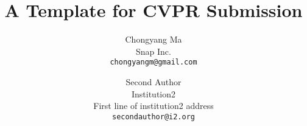 \documentclass[10pt,twocolumn,letterpaper]{article}
\begin{document}
\title{A Template for CVPR Submission}

\author{Chongyang Ma\\
Snap Inc.\\
{\tt\small chongyangm@gmail.com}
\and
Second Author\\
Institution2\\
First line of institution2 address\\
{\tt\small secondauthor@i2.org}
}

\maketitle








{\small


}
\end{document}
